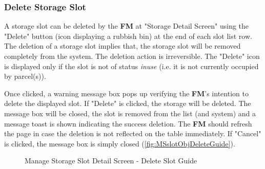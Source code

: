 \subsubsection{Delete Storage Slot}
\label{subsubsec:deleteSlot}

A storage slot can be deleted by the \textbf{FM} at "Storage Detail Screen" using the "Delete" button (icon displaying a rubbish bin) at the end of each slot list row. 
The deletion of a storage slot implies that, the storage slot will be removed completely from the system. The deletion action is irreversible. 
The "Delete" icon is displayed only if the slot is not of status \textit{inuse} (i.e. it is not currently occupied by parcel(s)).

Once clicked, a warning message box pops up verifying the \textbf{FM}'s intention to delete the displayed slot. If "Delete" is clicked, the storage will be deleted. The message box will be closed, the slot is removed from the list (and system) and a message toast is shown indicating the success deletion. The \textbf{FM} should refresh the page in case the deletion is not reflected on the table immediately. If "Cancel" is clicked, the message box is simply closed (\autoref{fig:MSslotObjDeleteGuide}).

\begin{figure}[H]
	\centering
  
    \vspace{1pt}
    
    \caption{Manage Storage Slot Detail Screen - Delete Slot Guide}
	\label{fig:MSslotObjDeleteGuide}
\end{figure}


